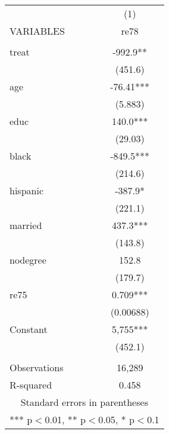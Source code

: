 \begin{tabular}{lc} \hline
 & (1) \\
VARIABLES & re78 \\ \hline
 &  \\
treat & -992.9** \\
 & (451.6) \\
age & -76.41*** \\
 & (5.883) \\
educ & 140.0*** \\
 & (29.03) \\
black & -849.5*** \\
 & (214.6) \\
hispanic & -387.9* \\
 & (221.1) \\
married & 437.3*** \\
 & (143.8) \\
nodegree & 152.8 \\
 & (179.7) \\
re75 & 0.709*** \\
 & (0.00688) \\
Constant & 5,755*** \\
 & (452.1) \\
 &  \\
Observations & 16,289 \\
 R-squared & 0.458 \\ \hline
\multicolumn{2}{c}{ Standard errors in parentheses} \\
\multicolumn{2}{c}{ *** p$<$0.01, ** p$<$0.05, * p$<$0.1} \\
\end{tabular}
